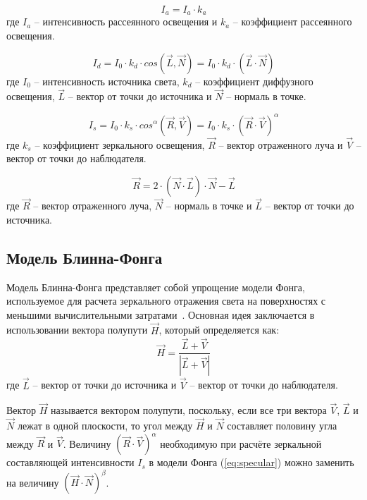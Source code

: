\begin{equation}
	I_a = I_a \cdot k_a
\end{equation}
где $I_a$ -- интенсивность рассеянного освещения и $k_a$ -- коэффициент рассеянного освещения.

\begin{equation}
	I_d = I_0 \cdot k_d \cdot cos(\vec{L}, \vec{N}) = I_0 \cdot k_d \cdot (\vec{L} \cdot \vec{N})
\end{equation}
где $I_0$ -- интенсивность источника света, $k_d$ -- коэффициент диффузного освещения, $\vec{L}$ -- вектор от точки до источника и $\vec{N}$ -- нормаль в точке.

\begin{equation}
	I_s = I_0 \cdot k_s \cdot cos^{\alpha}(\vec{R}, \vec{V}) = I_0 \cdot k_s \cdot (\vec{R} \cdot \vec{V})^{\alpha}
	\label{eq:specular}
\end{equation}
где $k_s$ -- коэффициент зеркального освещения, $\vec{R}$ -- вектор отраженного луча и $\vec{V}$ -- вектор от точки до наблюдателя.

\begin{equation}
	\vec{R} = 2 \cdot (\vec{N} \cdot \vec{L}) \cdot \vec{N} - \vec{L}
\end{equation}
где $\vec{R}$ -- вектор отраженного луча, $\vec{N}$ -- нормаль в точке и $\vec{L}$ -- вектор от точки до источника.

\subsection{Модель Блинна-Фонга}
Модель Блинна-Фонга представляет собой упрощение модели Фонга, используемое для расчета зеркального отражения света на поверхностях с меньшими вычислительными затратами~\cite{lit3, lit7}. Основная идея заключается в использовании вектора полупути $\vec{H}$, который определяется как:
\begin{equation}
	\vec{H} = \frac{\vec{L} + \vec{V}}{|\vec{L} + \vec{V}|}
\end{equation}
где  $\vec{L}$ -- вектор от точки до источника и $\vec{V}$ -- вектор от точки до наблюдателя. 

Вектор $\vec{H}$ называется вектором полупути, поскольку, если все три вектора $\vec{V}$, $\vec{L}$ и $\vec{N}$ лежат в одной плоскости, то угол между $\vec{H}$ и $\vec{N}$ составляет половину угла между $\vec{R}$ и $\vec{V}$. Величину $(\vec{R} \cdot \vec{V})^{\alpha}$ необходимую при расчёте зеркальной составляющей интенсивности $I_s$ в модели Фонга (\ref{eq:specular}) можно заменить на величину $(\vec{H} \cdot \vec{N})^{\beta}$.

